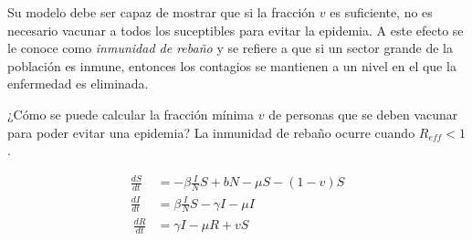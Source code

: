 \documentclass[
]{article}
\begin{document}
Su modelo debe ser capaz de mostrar que si la fracción \(v\) es
suficiente, no es necesario vacunar a todos los suceptibles para evitar
la epidemia. A este efecto se le conoce como \emph{inmunidad de rebaño}
y se refiere a que si un sector grande de la población es inmune,
entonces los contagios se mantienen a un nivel en el que la enfermedad
es eliminada.

¿Cómo se puede calcular la fracción mínima \(v\) de personas que se
deben vacunar para poder evitar una epidemia? La inmunidad de rebaño
ocurre cuando \(R_{eff}< 1\).

\[
\begin{aligned}
\frac{dS}{dt}&= -\beta \frac{I}{N} S+bN-\mu S-(1-v)S\\
\frac{dI}{dt}&= \beta\frac{I}{N}S-\gamma I-\mu I\\\
\frac{dR}{dt}&= \gamma I-\mu R+vS
\end{aligned}
\]
\end{document}
